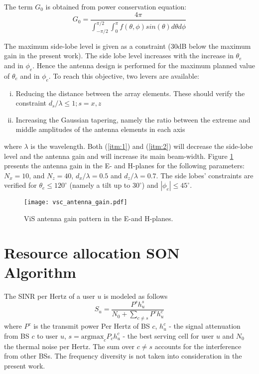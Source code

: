 \documentclass[conference]{IEEEtran}
\begin{document}
	The term $G_0$ is obtained from power conservation equation:
	\begin{equation} \label{eq:max_gain}
		G_0 = \frac{4\pi}{\int_{-\pi/2}^{\pi/2} \int_0^\pi f(\theta,\phi) sin(\theta) d \theta d\phi}
	\end{equation}

	The maximum side-lobe level is given as a constraint (30dB below the maximum gain in the present work). The side lobe level increases with the increase in $\theta_e$  and in $\phi_e$. Hence the antenna design is performed for the maximum planned value of $\theta_e$  and in $\phi_e$. To reach this objective, two levers are available:
	\begin{enumerate}[(i)]
	\item Reducing the distance between the array elements. These should verify the constraint $d_s/\lambda\leq 1; s=x,z$ \label{itm:1}
	\item Increasing the Gaussian tapering, namely the ratio between the extreme and middle amplitudes of the antenna elements in each axis \label{itm:2}
	\end{enumerate}
	where $\lambda$ is the wavelength. Both (\ref{itm:1}) and (\ref{itm:2}) will decrease the side-lobe level and the antenna gain and will increase its main beam-width. Figure \ref{fig:ant_gain} presents the antenna gain in the E- and H-planes for the following parameters: $N_x=10$, and $N_z=40$, $d_x/\lambda=0.5$ and $d_z/\lambda=0.7$. The side lobes' constraints are verified for  $\theta_e \leq 120^\circ$  (namely a tilt up to $30^\circ$) and $|\phi_e| \leq 45^\circ$.

\begin{figure}[!ht]
\centering
\texttt{[image: vsc\_antenna\_gain.pdf]}
\caption{\ac{ViS} antenna gain pattern in the E-and H-planes.}
\label{fig:ant_gain}
\end{figure}


\section{Resource allocation SON Algorithm} \label{sec:son_algo}
	The \ac{SINR} per Hertz of a user $u$ is modeled as follows
	\begin{equation} \label{eq:mac_sinr_novis}
	S_u = \frac{P^s h_u^s}{N_0 + \sum_{c \neq s} P^c h_u^c}
	\end{equation}
	where $P^c$ is the transmit power Per Hertz of \ac{BS} $c$, $h_u^c$ - the signal attenuation from \ac{BS} $c$ to user $u$, $s=\text{argmax}_c P_c h_u^c$ - the best serving cell for user $u$ and $N_0$ the thermal noise per Hertz. The sum over $c \neq s$ accounts for the interference from other \acp{BS}. The frequency diversity is not taken into consideration in the present work.
\end{document}
